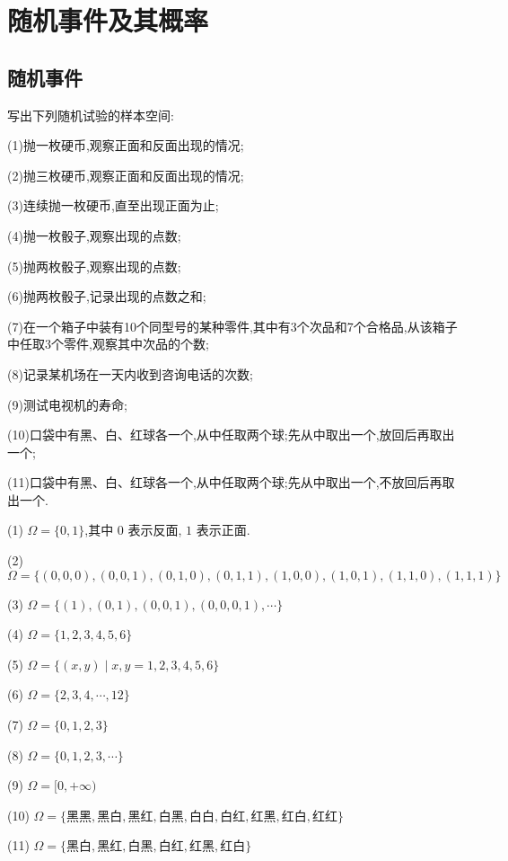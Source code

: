 
\chapter{随机事件及其概率}
\thispagestyle{plain}

\section{随机事件}

\question 写出下列随机试验的样本空间:

(1)抛一枚硬币,观察正面和反面出现的情况;

(2)抛三枚硬币,观察正面和反面出现的情况;

(3)连续抛一枚硬币,直至出现正面为止;

(4)抛一枚骰子,观察出现的点数;

(5)抛两枚骰子,观察出现的点数;

(6)抛两枚骰子,记录出现的点数之和;

(7)在一个箱子中装有10个同型号的某种零件,其中有3个次品和7个合格品,从该箱子中任取3个零件,观察其中次品的个数;

(8)记录某机场在一天内收到咨询电话的次数;

(9)测试电视机的寿命;

(10)口袋中有黑、白、红球各一个,从中任取两个球;先从中取出一个,放回后再取出一个;

(11)口袋中有黑、白、红球各一个,从中任取两个球;先从中取出一个,不放回后再取出一个.

\begin{solution}
    (1) $\varOmega = \{ 0, 1 \}$,其中 $0$ 表示反面, $1$ 表示正面.

    (2) $\varOmega = \{ (0,0,0), (0,0,1), (0,1,0), (0,1,1), (1,0,0), (1,0,1), (1,1,0), (1,1,1) \}$

    (3) $\varOmega = \{ (1), (0,1), (0,0,1), (0,0,0,1), \cdots \}$

    (4) $\varOmega = \{ 1,2,3,4,5,6 \}$

    (5) $\varOmega = \{ (x,y) \mid x,y = 1,2,3,4,5,6 \}$

    (6) $\varOmega = \{ 2, 3, 4, \cdots, 12 \}$

    (7) $\varOmega = \{ 0,1,2,3 \}$

    (8) $\varOmega = \{ 0,1,2,3,\cdots \}$

    (9) $\varOmega = [0, +\infty)$

    (10) $\varOmega = \{ \text{黑黑}, \text{黑白}, \text{黑红}, \text{白黑}, \text{白白}, \text{白红}, \text{红黑}, \text{红白}, \text{红红} \}$

    (11) $\varOmega = \{ \text{黑白}, \text{黑红}, \text{白黑}, \text{白红}, \text{红黑}, \text{红白} \}$
\end{solution}

